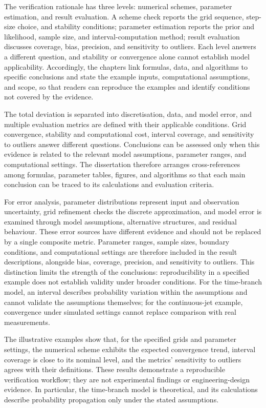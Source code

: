 \begin{englishabstract}
The verification rationale has three levels: numerical schemes, parameter estimation, and result evaluation. A scheme check reports the grid sequence, step-size choice, and stability conditions; parameter estimation reports the prior and likelihood, sample size, and interval-computation method; result evaluation discusses coverage, bias, precision, and sensitivity to outliers. Each level answers a different question, and stability or convergence alone cannot establish model applicability. Accordingly, the chapters link formulas, data, and algorithms to specific conclusions and state the example inputs, computational assumptions, and scope, so that readers can reproduce the examples and identify conditions not covered by the evidence.

The total deviation is separated into discretisation, data, and model error, and multiple evaluation metrics are defined with their applicable conditions. Grid convergence, stability and computational cost, interval coverage, and sensitivity to outliers answer different questions. Conclusions can be assessed only when this evidence is related to the relevant model assumptions, parameter ranges, and computational settings. The dissertation therefore arranges cross-references among formulas, parameter tables, figures, and algorithms so that each main conclusion can be traced to its calculations and evaluation criteria.

For error analysis, parameter distributions represent input and observation uncertainty, grid refinement checks the discrete approximation, and model error is examined through model assumptions, alternative structures, and residual behaviour. These error sources have different evidence and should not be replaced by a single composite metric. Parameter ranges, sample sizes, boundary conditions, and computational settings are therefore included in the result descriptions, alongside bias, coverage, precision, and sensitivity to outliers. This distinction limits the strength of the conclusions: reproducibility in a specified example does not establish validity under broader conditions. For the time-branch model, an interval describes probability variation within the assumptions and cannot validate the assumptions themselves; for the continuous-jet example, convergence under simulated settings cannot replace comparison with real measurements.

The illustrative examples show that, for the specified grids and parameter settings, the numerical scheme exhibits the expected convergence trend, interval coverage is close to its nominal level, and the metrics’ sensitivity to outliers agrees with their definitions. These results demonstrate a reproducible verification workflow; they are not experimental findings or engineering-design evidence. In particular, the time-branch model is theoretical, and its calculations describe probability propagation only under the stated assumptions.


\end{englishabstract}
